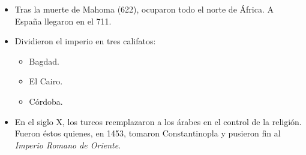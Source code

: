 \begin{itemize}
\item Tras la muerte de Mahoma (622), ocuparon todo el norte de África.
A España llegaron en el 711.

\item Dividieron el imperio en tres califatos:
\begin{itemize}
	\item Bagdad.
	\item El Cairo.
	\item Córdoba.
\end{itemize}

\item En el siglo X, los turcos reemplazaron a los árabes en el control de la religión.
Fueron éstos quienes, en 1453, tomaron Constantinopla y pusieron fin al \emph{Imperio Romano de Oriente}.

\end{itemize}